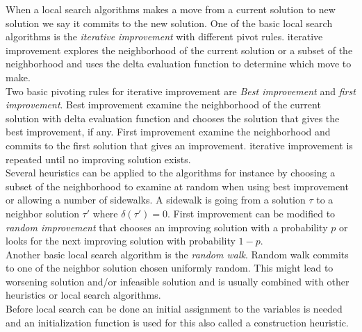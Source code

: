 When a local search algorithms makes a move from a current solution to new solution we say it commits to the new 
solution. One of the basic local search algorithms is the \emph{iterative improvement} with different pivot rules. 
iterative improvement explores the neighborhood of the current solution or a subset of the neighborhood and uses the 
delta evaluation function to determine which move to make. \\ 
Two basic pivoting rules for iterative improvement are \emph{Best improvement} and \emph{first 
improvement}. Best improvement examine the neighborhood of the current solution with delta evaluation function and 
chooses the solution that gives the best improvement, if any. First improvement examine the neighborhood and commits to 
the first solution that gives an improvement. iterative improvement is repeated until no improving solution exists. \\ 
Several heuristics can be applied to the algorithms for instance by choosing a subset of the neighborhood to examine at 
random when using best improvement or allowing a number of sidewalks. A sidewalk is going from a solution $\tau$ to a 
neighbor solution $\tau'$ where $\delta(\tau') = 0$. First improvement can be modified to \emph{random improvement} that 
chooses an improving solution with a probability $p$ or looks for the next improving solution with probability $1-p$. 
\\
Another basic local search algorithm is the \emph{random walk}. Random walk commits to one of the neighbor 
solution chosen uniformly random. This might lead to worsening solution and/or infeasible solution and is usually 
combined with other heuristics or local search algorithms. \\
Before local search can be done an initial assignment to the variables is needed and an initialization function is 
used for this also called a construction heuristic. 